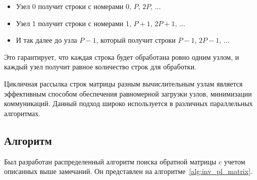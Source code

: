 \begin{itemize}
    \item Узел 0 получит строки с номерами $0$, $P$, $2P$, ...
    \item Узел 1 получит строки с номерами 1, $P+1$, $2P+1$, ...
    \item И так далее до узла $P-1$, который получит строки $P-1$, $2P-1$, ...
\end{itemize}

Это гарантирует, что каждая строка будет обработана ровно одним узлом, и каждый узел получит равное количество строк для обработки.


Цикличная рассылка строк матрицы разным вычислительным узлам является эффективным способом обеспечения равномерной загрузки узлов, минимизации коммуникаций.
Данный подход широко используется в различных параллельных алгоритмах.


\subsection*{Алгоритм}

Был разработан распределенный алгоритм поиска обратной матрицы c учетом описанных выше замечаний.
Он представлен на алгоритме~\ref{alg:inv_pl_matrix}.


